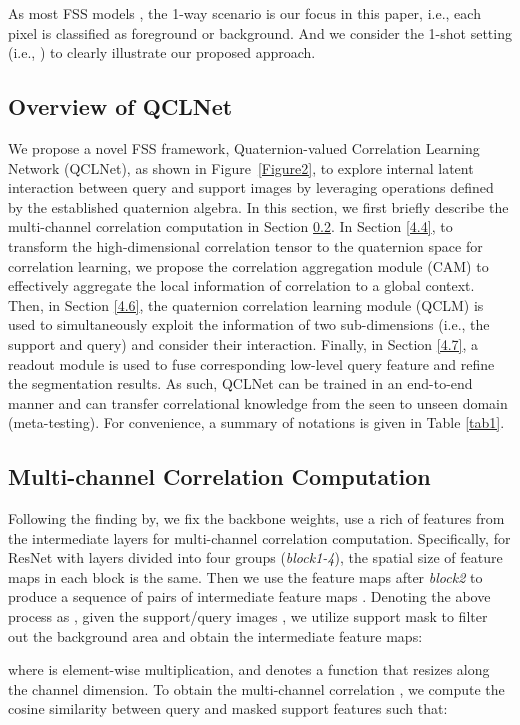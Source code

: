 \documentclass[lettersize,journal]{IEEEtran}
\begin{document}
As most FSS models \cite{RN8,RN24,RN7,RN6,RN22}, the 1-way scenario is our focus in this paper, i.e., each pixel is classified as foreground or background. And we consider the 1-shot setting (i.e., ) to clearly illustrate our proposed approach.

\subsection{Overview of QCLNet}\label{4.2}
We propose a novel FSS framework, Quaternion-valued Correlation Learning Network (QCLNet), as shown in Figure~\ref{Figure2}, to explore internal latent interaction between query and support images by leveraging operations defined by the established quaternion algebra. In this section, we first briefly describe the multi-channel correlation computation in Section \ref{4.3}. In Section \ref{4.4}, to transform the high-dimensional correlation tensor to the quaternion space for correlation learning, we propose the correlation aggregation module (CAM) to effectively aggregate the local information of correlation to a global context. Then, in Section \ref{4.6}, the quaternion correlation learning module (QCLM) is used to simultaneously exploit the information of two sub-dimensions (i.e., the support and query) and consider their interaction. Finally, in Section \ref{4.7}, a readout module is used to fuse corresponding low-level query feature and refine the segmentation results. As such, QCLNet can be trained in an end-to-end manner and can transfer correlational knowledge from the seen to unseen domain (meta-testing). For convenience, a summary of notations is given in Table \ref{tab1}.

\subsection{Multi-channel Correlation Computation}\label{4.3}
Following the finding by\cite{RN6,RN24,RN18}, we fix the backbone weights, use a rich of features from the intermediate layers for multi-channel correlation computation. Specifically, for ResNet with layers divided into four groups (\textit{block1-4}), the spatial size of feature maps in each block is the same. Then we use the feature maps after \textit{block2} to produce a sequence of  pairs of intermediate feature maps . Denoting the above process as , given the support/query images , we utilize support mask  to filter out the background area and obtain the intermediate feature maps:

where  is element-wise multiplication, and  denotes a function that resizes  along the channel dimension. To obtain the multi-channel correlation , we compute the cosine similarity between query and masked support features such that: 
\end{document}

